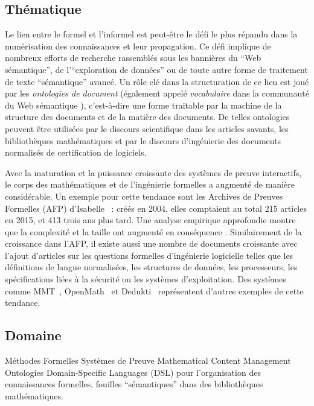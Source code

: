\documentclass[a4paper,10pt]{article}
\begin{document}
\subsection*{Thématique}

Le lien entre le formel et l'informel est peut-être
le défi le plus répandu dans la numérisation des connaissances
et leur propagation.
Ce défi implique de nombreux efforts de recherche
rassemblés sous les bannières du \enquote{Web sémantique},
de l'\enquote{exploration de données}
ou de toute autre forme de traitement de texte \enquote{sémantique} avancé.
Un rôle clé dans la structuration de ce lien est joué
par les \emph{ontologies de document}
(également appelé \emph{vocabulaire} dans la communauté du Web sémantique
\cite{owlgred}),
c'est-à-dire une forme traitable par la machine de la structure des documents
et de la matière des documents.
De telles ontologies peuvent être utilisées
par le discours scientifique dans les articles savants,
les bibliothèques mathématiques
et par le discours d'ingénierie des documents normalisés
de certification de logiciels.

Avec la maturation et la puissance croissante des systèmes de preuve interactifs,
le corps des mathématiques et de l'ingénierie formelles a augmenté
de manière considérable.
Un exemple pour cette tendance sont
les Archives de Preuves Formelles (AFP) d'Isabelle~\cite{afp} :
créés en 2004, elles comptaient au total 215 articles en 2015,
et 413 trois ans plus tard.
Une analyse empirique approfondie montre que
la complexité et la taille ont augmenté en conséquence
\cite{DBLP:conf/mkm/BlanchetteHMN15}.
Similairement de la croissance dans l'AFP, il existe aussi
une nombre de documents croissante avec l'ajout d'articles
sur les questions formelles d'ingénierie logicielle
telles que les définitions de langue normalisées,
les structures de données, les processeurs,
les spécifications liées à la sécurité  ou les systèmes d'exploitation.
Des systèmes comme MMT~\cite{mmt}, OpenMath~\cite{openmath}
et Dedukti~\cite{dedukti} représentent
d'autres exemples de cette tendance.

\subsection*{Domaine}

Méthodes Formelles \textemdash{}
Systèmes de Preuve \textemdash{}
Mathematical Content Management \textemdash{}
Ontologies \textemdash{}
Domain-Specific Languages (DSL)
pour l'organisation des connaissances formelles,
fouilles \enquote{sémantiques} dans des bibliothèques mathématiques.
\end{document}
